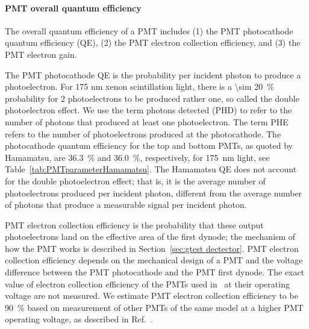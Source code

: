 \paragraph{PMT overall quantum efficiency} 
The overall quantum efficiency of a PMT includes (1) the PMT photocathode quantum efficiency (QE), (2) the PMT electron collection efficiency, and (3) the PMT electron gain.

The PMT photocathode QE is the probability per incident photon to produce a photoelectron. For 175 nm xenon scintillation light, there is a \SI{\sim 20}{\percent} probability for 2 photoelectrons to be produced rather one, so called the double photoelectron effect. We use the term photons detected (PHD) to refer to the number of photons that produced at least one photoelectron. The term PHE refers to the number of photoelectrons produced at the photocathode. The photocathode quantum efficiency for the top and bottom PMTs, as quoted by Hamamatsu, are \SI{36.3}{\percent} and \SI{36.0}{\percent}, respectively, for \SI{175}{\nm} light, see Table~\ref{tab:PMTparameterHamamatsu}. The Hamamatsu QE does not account for the double photoelectron effect; that is, it is the average number of photoelectrons produced per incident photon, different from the average number of photons that produce a measurable signal per incident photon.



PMT electron collection efficiency is the probability that these output photoelectrons land on the effective area of the first dynode; the mechanism of how the PMT works is described in Section~\ref{sec:gtest dectector}. %
PMT electron collection efficiency depends on the mechanical design of a PMT and the voltage difference between the PMT photocathode and the PMT first dynode. The exact value of electron collection efficiency of the PMTs used in \gtest\ at their operating voltage are not measured. We estimate PMT electron collection efficiency to be \SI{90}{\percent} based on measurement of other PMTs of the same model at a higher PMT operating voltage, as described in Ref.~\cite{Lung2012}.

